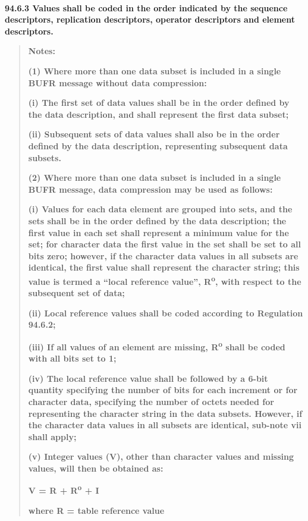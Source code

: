 \textbf{\\
}

\textbf{94.6.3 Values shall be coded in the order indicated by the sequence descriptors, replication descriptors, operator descriptors and element descriptors.}

\begin{quote}
\textbf{Notes:}

\textbf{(1) Where more than one data subset is included in a single BUFR message without data compression:}

\textbf{(i) The first set of data values shall be in the order defined by the data description, and shall represent the first data subset;}

\textbf{(ii) Subsequent sets of data values shall also be in the order defined by the data description, representing subsequent data subsets.}

\textbf{(2) Where more than one data subset is included in a single BUFR message, data compression may be used as follows:}

\textbf{(i) Values for each data element are grouped into sets, and the sets shall be in the order defined by the data description; the first value in each set shall represent a minimum value for the set; for character data the first value in the set shall be set to all bits zero; however, if the character data values in all subsets are identical, the first value shall represent the character string; this value is termed a ``local reference value'', R\textsuperscript{o}, with respect to the subsequent set of data;}

\textbf{(ii) Local reference values shall be coded according to Regulation 94.6.2;}

\textbf{(iii) If all values of an element are missing, R\textsuperscript{o} shall be coded with all bits set to 1;}

\textbf{(iv) The local reference value shall be followed by a 6-bit quantity specifying the number of bits for each increment or for character data, specifying the number of octets needed for representing the character string in the data subsets. However, if the character data values in all subsets are identical, sub-note vii shall apply;}

\textbf{(v) Integer values (V), other than character values and missing values, will then be obtained as:}

\textbf{V = R + R\textsuperscript{o} + I}

\textbf{where R = table reference value}


\end{quote}
